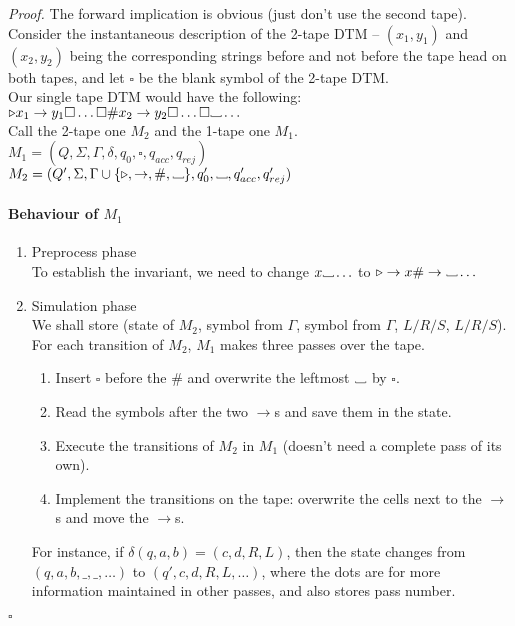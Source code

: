 \documentclass[a4paper]{article}
\newenvironment{proof}{\begin{breakbox}\textit{Proof.}}{\hfill$\square$\end{breakbox}}
\newcommand{\nl}{\vspace{0.2cm}\\}
\newcommand\Vtextvisiblespace[1][.3em]{%
    \mbox{\kern.06em\vrule height.3ex}%
    \vbox{\hrule width#1}%
    \hbox{\vrule height.3ex}
}
\newcommand{\blank}{{\Vtextvisiblespace[0.7em]}}
\newcommand{\leftend}{\triangleright}
\begin{document}
\begin{proof}
    The forward implication is obvious (just don't use the second tape).\nl
    Consider the instantaneous description of the 2-tape DTM -- $(x_1, y_1)$ and $(x_2, y_2)$ being the corresponding strings before and not before the tape head on both tapes, and let $\square$ be the blank symbol of the 2-tape DTM.\nl
    Our single tape DTM would have the following:
    $\leftend x_1 \to y_1 \square \ldots \square \# x_2 \to y_2 \square \ldots \square 
    \blank \ldots $\nl
    Call the 2-tape one $M_2$ and the 1-tape one $M_1$.\nl
    $M_1 = (Q, \Sigma, \Gamma, \delta, q_0, \square, q_{acc}, q_{rej})$\nl
    $M_2 = (Q', \Sigma, \Gamma \cup \{\leftend, \to, \#, \blank\}, q_0', \blank, q_{acc}', q_{rej}')$\nl
    \paragraph{Behaviour of $M_1$}
    \begin{enumerate}
        \item Preprocess phase\nl
            To establish the invariant, we need to change $x \blank \ldots $ to $\leftend \to x \# \to \blank \ldots$
        \item Simulation phase\nl
            We shall store (state of $M_2$, symbol from $\Gamma$, symbol from $\Gamma$, $L/R/S$, $L/R/S$).\nl
            For each transition of $M_2$, $M_1$ makes three passes over the tape.
            \begin{enumerate}
                \item Insert $\square$ before the $\#$ and overwrite the leftmost $\blank$ by $\square$.
                \item Read the symbols after the two $\to$s and save them in the state.
                \item Execute the transitions of $M_2$ in $M_1$ (doesn't need a complete pass of its own).
                \item Implement the transitions on the tape: overwrite the cells next to the $\to$s and move the $\to$s.
            \end{enumerate}
            For instance, if $\delta(q, a, b) = (c, d, R, L)$, then the state changes from $(q, a, b, \_, \_, \ldots)$ to $(q', c, d, R, L, \ldots)$, where the dots are for more information
            maintained in other passes, and also stores pass number.
    \end{enumerate}
\end{proof}
\end{document}
